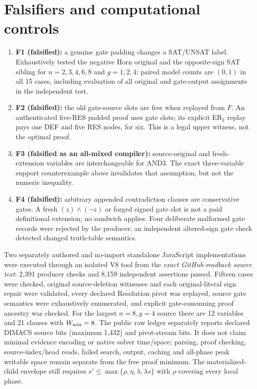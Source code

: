 \documentclass[11pt]{article}
\begin{document}
\section*{Falsifiers and computational controls}
\begin{enumerate}
\item[] \textbf{F1 (falsified):} a genuine gate padding changes a SAT/UNSAT label. Exhaustively tested the negative Horn original and the opposite-sign SAT sibling for $n=2,3,4,6,8$ and $g=1,2,4$: paired model counts are $(0,1)$ in all 15 cases, including evaluation of all original and gate-output assignments in the independent test.
\item[] \textbf{F2 (falsified):} the old gate-source slots are free when replayed from $F$. An authenticated five-RES padded proof uses gate slots; its explicit ER$_2$ replay pays one DEF and five RES nodes, for six. This is a legal upper witness, not the optimal proof.
\item[] \textbf{F3 (falsified as an all-mixed compiler):} source-original and fresh-extension variables are interchangeable for AND3. The exact three-variable support counterexample above invalidates that assumption, but not the numeric inequality.
\item[] \textbf{F4 (falsified):} arbitrary appended contradiction clauses are conservative gates. A fresh $(z)\wedge(\neg z)$ or forged signed gate slot is not a paid definitional extension; no sandwich applies. Four deliberate malformed gate records were rejected by the producer; an independent altered-sign gate check detected changed truth-table semantics.
\end{enumerate}
Two separately authored and no-import standalone JavaScript implementations were executed through an isolated V8 tool from the \emph{exact GitHub-readback source text}: 2,391 producer checks and 8,159 independent assertions passed. Fifteen cases were checked, original source-deletion witnesses and each original-literal sign repair were validated, every declared Resolution pivot was replayed, source gate semantics were exhaustively enumerated, and explicit gate-consuming proof ancestry was checked. For the largest $n=8,g=4$ source there are 12 variables and 21 clauses with $W_{\rm mix}=8$. The public raw ledger separately reports declared DIMACS source bits (maximum 1,432) and pivot-stream bits. It does not claim minimal evidence encoding or native solver time/space; parsing, proof checking, source-index/head reads, failed search, output, caching and all-phase peak writable space remain separate from the free proof minimum. The materialized-child envelope still requires $s'\le\max\{\rho,\eta,\lambda,\lambda s\}$ with $\rho$ covering every local phase.
\end{document}
